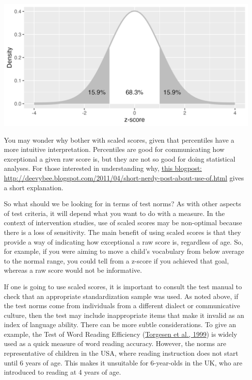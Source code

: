 \documentclass{krantz}
\begin{document}
\begin{tcolorbox}[enhanced, breakable,colback=Black!5!lightgray,colframe=black!75!black,coltitle=white,title=How scaled scores are derived]
\includegraphics[width=0.75\linewidth]{images_bw/zDensityCDF} \label{zDensityCDF}
  
  
You may wonder why bother with scaled scores, given that percentiles have a more intuitive interpretation. Percentiles are good for communicating how exceptional a given raw score is, but they are not so good for doing statistical analyses. For those interested in understanding why, \href{http://deevybee.blogspot.com/2011/04/short-nerdy-post-about-use-of.html}{this blogpost: http://deevybee.blogspot.com/2011/04/short-nerdy-post-about-use-of.html} gives a short explanation.
\end{tcolorbox}

So what should we be looking for in terms of test norms? As with other aspects of test criteria, it will depend what you want to do with a measure. In the context of intervention studies, use of scaled scores may be non-optimal because there is a loss of sensitivity. The main benefit of using scaled scores is that they provide a way of indicating how exceptional a raw score is, regardless of age. So, for example, if you were aiming to move a child's vocabulary from below average to the normal range, you could tell from a z-score if you achieved that goal, whereas a raw score would not be informative.

If one is going to use scaled scores, it is important to consult the test manual to check that an appropriate standardization sample was used. As noted above, if the test norms come from individuals from a different dialect or communicative culture, then the test may include inappropriate items that make it invalid as an index of language ability. There can be more subtle considerations. To give an example, the Test of Word Reading Efficiency (\protect\hyperlink{ref-torgesen1999}{Torgesen et al., 1999}) is widely used as a quick measure of word reading accuracy. However, the norms are representative of children in the USA, where reading instruction does not start until 6 years of age. This makes it unsuitable for 6-year-olds in the UK, who are introduced to reading at 4 years of age.
\end{document}
